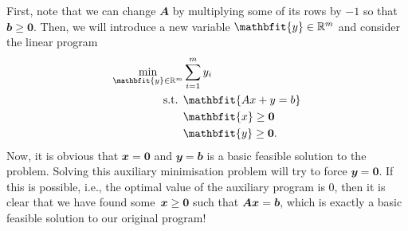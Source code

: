 \documentclass[math, code]{amznotes}
\theoremstyle{remark}
\begin{document}
First, note that we can change $\mathbfit{A}$ by multiplying some of its rows by $-1$ so that $\mathbfit{b} \geq \mathbf{0}$. Then, we will introduce a new variable $\mathbfit{y} \in \R^m$ and consider the linear program
\begin{align*}
    \min_{\mathbfit{y} \in \R^m} & \sum_{i = 1}^{m}y_i \\
    \textrm{s.t. } & \mathbfit{Ax + y = b} \\
    & \mathbfit{x} \geq \mathbf{0} \\
    & \mathbfit{y} \geq \mathbf{0}.
\end{align*}
Now, it is obvious that $\mathbfit{x} = \mathbf{0}$ and $\mathbfit{y} = \mathbfit{b}$ is a basic feasible solution to the problem. Solving this auxiliary minimisation problem will try to force $\mathbfit{y} = \mathbf{0}$. If this is possible, i.e., the optimal value of the auxiliary program is $0$, then it is clear that we have found some~$\mathbfit{x} \geq \mathbf{0}$ such that $\mathbfit{Ax = b}$, which is exactly a basic feasible solution to our original program! 
\end{document}
